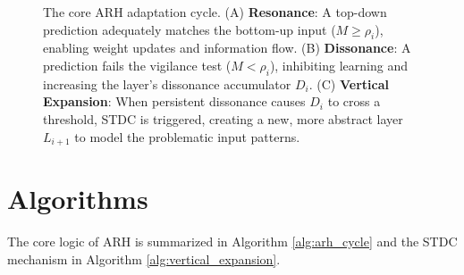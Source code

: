 \documentclass{article}
\begin{document}
\begin{figure}[h!]
    \caption{The core ARH adaptation cycle. (A) \textbf{Resonance}: A top-down prediction adequately matches the bottom-up input ($M \ge \rho_i$), enabling weight updates and information flow. (B) \textbf{Dissonance}: A prediction fails the vigilance test ($M < \rho_i$), inhibiting learning and increasing the layer's dissonance accumulator $D_i$. (C) \textbf{Vertical Expansion}: When persistent dissonance causes $D_i$ to cross a threshold, STDC is triggered, creating a new, more abstract layer $L_{i+1}$ to model the problematic input patterns.}
    \label{fig:arh_diagram}
\end{figure}

\section{Algorithms}
The core logic of ARH is summarized in Algorithm \ref{alg:arh_cycle} and the STDC mechanism in Algorithm \ref{alg:vertical_expansion}.
\end{document}
